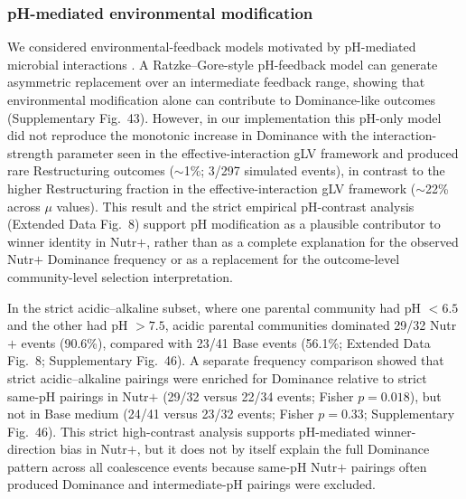 \subsubsection*{pH-mediated environmental modification}
We considered environmental-feedback models motivated by pH-mediated microbial interactions \citep{Ratzke2018,Ratzke2020}. A Ratzke--Gore-style pH-feedback model can generate asymmetric replacement over an intermediate feedback range, showing that environmental modification alone can contribute to Dominance-like outcomes (Supplementary Fig.~43). However, in our implementation this pH-only model did not reproduce the monotonic increase in Dominance with the interaction-strength parameter seen in the effective-interaction gLV framework and produced rare Restructuring outcomes ($\sim$1\%; 3/297 simulated events), in contrast to the higher Restructuring fraction in the effective-interaction gLV framework ($\sim$22\% across $\mu$ values). This result and the strict empirical pH-contrast analysis (Extended Data Fig.~8) support pH modification as a plausible contributor to winner identity in Nutr$+$, rather than as a complete explanation for the observed Nutr$+$ Dominance frequency or as a replacement for the outcome-level community-level selection interpretation.

In the strict acidic--alkaline subset, where one parental community had pH $<6.5$ and the other had pH $>7.5$, acidic parental communities dominated 29/32 Nutr$+$ events (90.6\%), compared with 23/41 Base events (56.1\%; Extended Data Fig.~8; Supplementary Fig.~46). A separate frequency comparison showed that strict acidic--alkaline pairings were enriched for Dominance relative to strict same-pH pairings in Nutr$+$ (29/32 versus 22/34 events; Fisher $p = 0.018$), but not in Base medium (24/41 versus 23/32 events; Fisher $p = 0.33$; Supplementary Fig.~46). This strict high-contrast analysis supports pH-mediated winner-direction bias in Nutr$+$, but it does not by itself explain the full Dominance pattern across all coalescence events because same-pH Nutr$+$ pairings often produced Dominance and intermediate-pH pairings were excluded.
